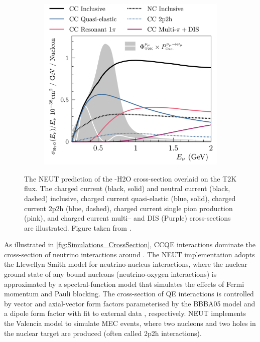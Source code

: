 \begin{figure}[h]
  \begin{subfigure}[t]{0.8\textwidth}
    \includegraphics[width=\textwidth, trim={0mm 0mm 0mm 0mm}, clip,page=1]{Figures/Simulations/NEUTCrossSection.pdf}
  \end{subfigure}
  \caption{The NEUT prediction of the \quickmath{\nu_{\mu}}-H2O cross-section overlaid on the T2K \quickmath{\nu_{\mu}} flux. The charged current (black, solid) and neutral current (black, dashed) inclusive, charged current quasi-elastic (blue, solid), charged current 2p2h (blue, dashed), charged current single pion production (pink), and charged current multi--\quickmath{\pi} and DIS (Purple) cross-sections are illustrated. Figure taken from \cite{Hayato2021}.}
  \label{fig:Simulations_CrossSection}
\end{figure}

As illustrated in \autoref{fig:Simulations_CrossSection}, CCQE interactions dominate the cross-section of neutrino interactions around . The NEUT implementation adopts the Llewellyn Smith \cite{llewelyn-smith} model for neutrino-nucleus interactions, where the nuclear ground state of any bound nucleons (neutrino-oxygen interactions) is approximated by a spectral-function \cite{Benhar1989} model that simulates the effects of Fermi momentum and Pauli blocking. The cross-section of QE interactions is controlled by vector and axial-vector form factors parameterised by the BBBA05 \cite{bbba05} model and a dipole form factor with  fit to external data \cite{Aguilar_Arevalo_2010}, respectively. NEUT implements the Valencia \cite{nieves2} model to simulate MEC events, where two nucleons and two holes in the nuclear target are produced (often called 2p2h interactions).

